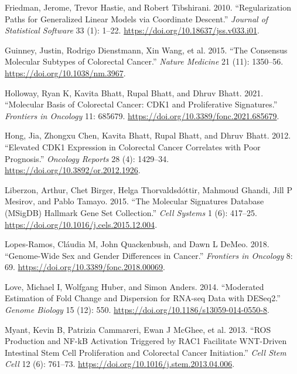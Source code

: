 \documentclass[
  12pt,
]{article}
\newlength{\cslhangindent}
\newenvironment{CSLReferences}[2] %
 {\begin{list}{}{%
  \setlength{\itemindent}{0pt}
  \setlength{\leftmargin}{0pt}
  \setlength{\parsep}{0pt}
  \ifodd #1
   \setlength{\leftmargin}{\cslhangindent}
   \setlength{\itemindent}{-1\cslhangindent}
  \fi
  \setlength{\itemsep}{#2\baselineskip}}}
 {\end{list}}
\begin{document}
\begin{CSLReferences}{1}{1}
Friedman, Jerome, Trevor Hastie, and Robert Tibshirani. 2010.
{``Regularization Paths for Generalized Linear Models via Coordinate
Descent.''} \emph{Journal of Statistical Software} 33 (1): 1--22.
\url{https://doi.org/10.18637/jss.v033.i01}.

Guinney, Justin, Rodrigo Dienstmann, Xin Wang, et al. 2015. {``The
Consensus Molecular Subtypes of Colorectal Cancer.''} \emph{Nature
Medicine} 21 (11): 1350--56. \url{https://doi.org/10.1038/nm.3967}.

Holloway, Ryan K, Kavita Bhatt, Rupal Bhatt, and Dhruv Bhatt. 2021.
{``Molecular Basis of Colorectal Cancer: {CDK1} and Proliferative
Signatures.''} \emph{Frontiers in Oncology} 11: 685679.
\url{https://doi.org/10.3389/fonc.2021.685679}.

Hong, Jia, Zhongxu Chen, Kavita Bhatt, Rupal Bhatt, and Dhruv Bhatt.
2012. {``Elevated {CDK1} Expression in Colorectal Cancer Correlates with
Poor Prognosis.''} \emph{Oncology Reports} 28 (4): 1429--34.
\url{https://doi.org/10.3892/or.2012.1926}.

Liberzon, Arthur, Chet Birger, Helga Thorvaldsdóttir, Mahmoud Ghandi,
Jill P Mesirov, and Pablo Tamayo. 2015. {``The Molecular Signatures
Database ({MSigDB}) Hallmark Gene Set Collection.''} \emph{Cell Systems}
1 (6): 417--25. \url{https://doi.org/10.1016/j.cels.2015.12.004}.

Lopes-Ramos, Cláudia M, John Quackenbush, and Dawn L DeMeo. 2018.
{``Genome-Wide Sex and Gender Differences in Cancer.''} \emph{Frontiers
in Oncology} 8: 69. \url{https://doi.org/10.3389/fonc.2018.00069}.

Love, Michael I, Wolfgang Huber, and Simon Anders. 2014. {``Moderated
Estimation of Fold Change and Dispersion for {RNA-seq} Data with
{DESeq2}.''} \emph{Genome Biology} 15 (12): 550.
\url{https://doi.org/10.1186/s13059-014-0550-8}.

Myant, Kevin B, Patrizia Cammareri, Ewan J McGhee, et al. 2013. {``{ROS}
Production and {NF-kB} Activation Triggered by {RAC1} Facilitate
{WNT}-Driven Intestinal Stem Cell Proliferation and Colorectal Cancer
Initiation.''} \emph{Cell Stem Cell} 12 (6): 761--73.
\url{https://doi.org/10.1016/j.stem.2013.04.006}.


\end{CSLReferences}
\end{document}
